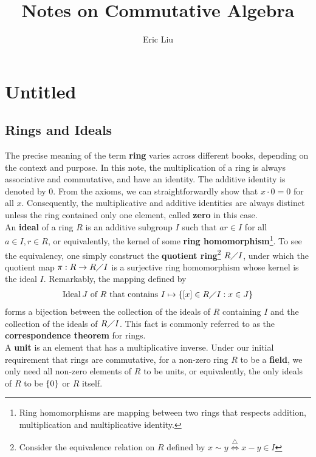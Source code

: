 \documentclass{report}
\title{Notes on Commutative Algebra}
\author{Eric Liu}
\date{}
\begin{document}
\maketitle
\newpage%

\tableofcontents
\pagebreak
\chapter{Untitled} 
\section{Rings and Ideals}
The precise meaning of the term \textbf{ring} varies across different books, depending on the context and purpose. In this note, the multiplication of a ring is always associative and commutative, and have an identity. The additive identity is denoted by $0$. From the axioms, we can straightforwardly show that $x\cdot 0 = 0$ for all $x$. Consequently, the multiplicative and additive identities are always distinct unless the ring contained only one element, called  \textbf{zero} in this case.\\

An \textbf{ideal} of a ring $R$ is an additive subgroup $I$ such that $ar \in I$ for all $a \in I,  r \in R$, or equivalently, the kernel of some \textbf{ring homomorphism}\footnote{Ring homomorphisms are mapping between two rings that respects addition, multiplication and  multiplicative identity.}. To see the equivalency, one simply construct the \textbf{quotient ring}\footnote{Consider the equivalence relation on $R$ defined by  $x\sim  y\overset{\triangle}{\iff } x-y \in I$} $R\diagup I$, under which the quotient map $\pi: R \rightarrow R \diagup  I$ is a surjective ring homomorphism whose kernel is the ideal $I$. Remarkably, the mapping defined by 
 \begin{align*}
\operatorname{Ideal }J\text{ of $R$ that contains }I \mapsto \{ [x]\in R\diagup I: x\in J \}
\end{align*}
forms a bijection between the collection of the ideals of $R$ containing  $I$ and the collection of the ideals of $R\diagup I$. This fact is commonly referred to as the \textbf{correspondence theorem} for rings. \\

A \textbf{unit} is an element that has a multiplicative inverse. Under our initial requirement that rings are commutative, for a non-zero ring $R$ to be a \textbf{field}, we only need all non-zero elements of $R$ to be units, or equivalently, the only ideals of $R$ to be $\{ 0 \}$ or $R$ itself.\\
\end{document}
